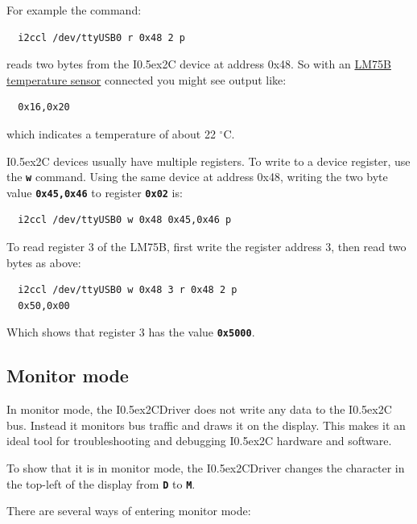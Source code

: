 \documentclass{article}
\newcommand{\two}{\raise0.5ex\hbox{\footnotesize{2}}}
\newcommand{\iic}{I\two{}C}
\newcommand{\iicdriver}{I\two{}CDriver}
\newcommand{\degc}{$^{\circ}$C}
\newcommand{\mach}[1]{\texttt{\textbf{#1}}}
\begin{document}
For example the command:

\begin{lstlisting}
  i2ccl /dev/ttyUSB0 r 0x48 2 p
\end{lstlisting}

reads two bytes from the \iic{} device at address 0x48.
So with an
\href{https://www.nxp.com/docs/en/data-sheet/LM75B.pdf}{LM75B temperature sensor}
connected you might see output like:

\begin{lstlisting}
  0x16,0x20
\end{lstlisting}

which indicates a temperature of about 22 \degc.

\iic{} devices usually have multiple registers. To write to a device register,
use the \mach{w} command.
Using the same device at address 0x48, writing the two byte value \mach{0x45,0x46} to register \mach{0x02} is:

\begin{lstlisting}
  i2ccl /dev/ttyUSB0 w 0x48 0x45,0x46 p
\end{lstlisting}

To read register 3 of the LM75B, first write the register address 3, then read two bytes as above:

\begin{lstlisting}
  i2ccl /dev/ttyUSB0 w 0x48 3 r 0x48 2 p
  0x50,0x00
\end{lstlisting}

Which shows that register 3 has the value \mach{0x5000}.

\subsection{Monitor mode}

In monitor mode, the \iicdriver{} does not write any data to the \iic{} bus.
Instead it monitors bus traffic and draws it on the display.
This makes it an ideal tool for troubleshooting and debugging \iic{} hardware and software.

To show that it is in monitor mode, the \iicdriver{} changes the character in the top-left of the display from \mach{D} to \mach{M}.

There are several ways of entering monitor mode:
\end{document}
